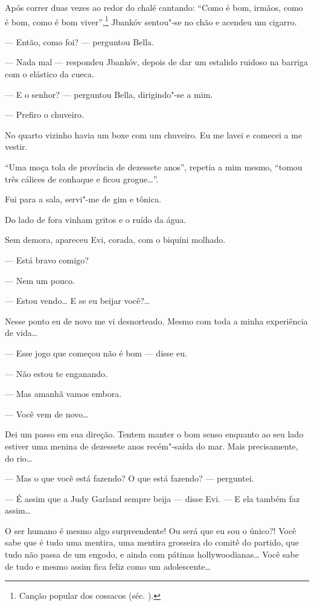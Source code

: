 Após correr duas vezes ao redor do chalé cantando: ``Como é bom, irmãos,
como é bom, como é bom viver'',\footnote{Canção popular dos cossacos
  (séc. ).} Jbankóv sentou"-se no chão e acendeu um cigarro.

--- Então, como foi? --- perguntou Bella.

--- Nada mal --- respondeu Jbankóv, depois de dar um
estalido ruidoso na barriga com o elástico da cueca.

--- E o senhor? --- perguntou Bella, dirigindo"-se a mim.

--- Prefiro o chuveiro.

No quarto vizinho havia um boxe com um chuveiro. Eu me lavei e comecei a
me vestir.

``Uma moça tola de província de dezessete anos'', repetia a mim mesmo,
``tomou três cálices de conhaque e ficou grogue\ldots{}''.

Fui para a sala, servi"-me de gim e tônica.

Do lado de fora vinham gritos e o ruído da água.

Sem demora, apareceu Evi, corada, com o biquíni molhado.

--- Está bravo comigo?

--- Nem um pouco.

--- Estou vendo\ldots{} E se eu beijar você?\ldots{}

Nesse ponto eu de novo me vi desnorteado. Mesmo com toda a minha
experiência de vida\ldots{}

--- Esse jogo que começou não é bom --- disse eu.

--- Não estou te enganando.

--- Mas amanhã vamos embora.

--- Você vem de novo\ldots{}

Dei um passo em sua direção. Tentem manter o bom senso enquanto ao seu
lado estiver uma menina de dezessete anos recém"-saída do mar. Mais
precisamente, do rio\ldots{}

--- Mas o que você está fazendo? O que está fazendo? ---
perguntei.

--- É assim que a Judy Garland sempre beija --- disse Evi.
--- E ela também faz assim\ldots{}

O ser humano é mesmo algo surpreendente! Ou será que eu sou o único?!
Você sabe que é tudo uma mentira, uma mentira grosseira do comitê do
partido, que tudo não passa de um engodo, e ainda com pátinas
hollywoodianas\ldots{} Você sabe de tudo e mesmo assim fica feliz como um
adolescente\ldots{}

